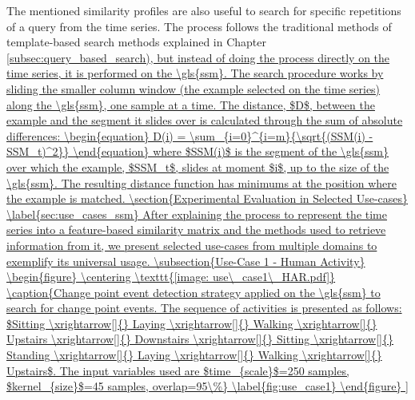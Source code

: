 The mentioned similarity profiles are also useful to search for specific repetitions of a query from the time series. The process follows the traditional methods of template-based search methods explained in Chapter \ref{subsec:query_based_search), but instead of doing the process directly on the time series, it is performed on the \gls{ssm}. The search procedure works by sliding the smaller column window (the example selected on the time series) along the \gls{ssm}, one sample at a time. The distance, $D$, between the example and the segment it slides over is calculated through the sum of absolute differences:

\begin{equation}
    D(i) = \sum_{i=0}^{i=m}{\sqrt{(SSM(i) - SSM_t)^2}}
\end{equation}

where $SSM(i)$ is the segment of the \gls{ssm} over which the example, $SSM_t$, slides at moment $i$, up to the size of the \gls{ssm}. The resulting distance function has minimums at the position where the example is matched.


\section{Experimental Evaluation in Selected Use-cases}
\label{sec:use_cases_ssm}

After explaining the process to represent the time series into a feature-based similarity matrix and the methods used to retrieve information from it, we present selected use-cases from multiple domains to exemplify its universal usage.

\subsection{Use-Case 1 - Human Activity}

\begin{figure}
    \centering
    \texttt{[image: use\_case1\_HAR.pdf]}
    \caption{Change point event detection strategy applied on the \gls{ssm} to search for change point events. The sequence of activities is presented as follows: $Sitting \xrightarrow[]{} Laying \xrightarrow[]{} Walking \xrightarrow[]{} Upstairs \xrightarrow[]{} Downstairs \xrightarrow[]{} Sitting \xrightarrow[]{} Standing \xrightarrow[]{} Laying \xrightarrow[]{} Walking \xrightarrow[]{} Upstairs$. The input variables used are $time_{scale}$=250 samples, $kernel_{size}$=45 samples, overlap=95\%}
    \label{fig:use_case1}
\end{figure}

}
